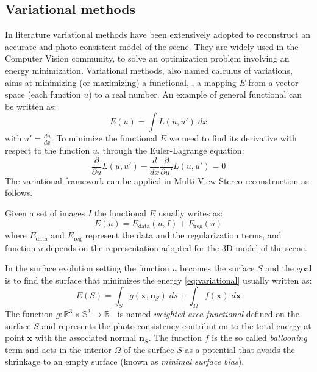 \subsection{Variational methods}
\label{subsec:variational}
In literature variational methods have been extensively adopted to reconstruct an accurate and photo-consistent model of the scene.
 They are widely used in the Computer Vision community, to solve an optimization problem involving an energy minimization.
Variational methods, also named  calculus of variations, aims at minimizing (or maximizing) a functional, \ie, a mapping $E$ from a vector space (each function $u$) to a real number. 
An example of general functional can be written as:
\begin{equation}
 E(u) = \int \mathit{L} (u, u')\;dx
\end{equation}
with $u'=\frac{du}{dx}$.
To minimize the functional $E$ we need to find its derivative with respect to the function $u$, through the Euler-Lagrange equation:
\begin{equation}
 \frac{\partial}{\partial u} \mathit{L} (u, u') - \frac{d}{dx} \frac{\partial}{\partial u'}\mathit{L} (u, u') =0
\end{equation}
The variational framework can be applied in Multi-View Stereo reconstruction \cite{hermosillo2002variational} as follows.

Given a set of images $\mathit{I}$ the functional $E$ usually writes as:
\begin{equation}
\label{eq:variational}
E(\mathit{u}) = E_{\text{data}}(\mathit{u}, \mathit{I}) + E_{\text{reg}} (\mathit{u})  
\end{equation}
where $E_{\text{data}}$  and $E_{\text{reg}}$ represent the data and the regularization terms, and function $\mathit{u}$ depends on the representation adopted for the 3D model of the scene.

In the surface evolution setting the function $\mathit{u}$ becomes the surface $\mathit{S}$ and the goal is to find the surface that minimizes the energy \eqref{eq:variational} usually written as:
\begin{equation}
 E(\mathit{S}) = \int_{\mathit{S}} g(\mathbf{x}, \mathbf{n}_{\mathit{S}}) \; ds  +\int_{\mathit{\Omega}} f(\mathbf{x}) \; d\mathbf{x}
\end{equation}
The function $\mathit{g}:\mathbb{R}^3\times\mathbb{S}^2 \rightarrow \mathbb{R}^+$ is named \emph{weighted area functional}  defined on the surface $\mathit{S}$ and represents the photo-consistency contribution to the total energy at point $\mathbf{x}$ with the associated normal $\mathbf{n}_{\mathit{S}}$.
The function $\mathit{f}$ is the so called \emph{ballooning} term and acts in the interior $\mathit{\Omega}$ of the surface $\mathit{S}$ as a potential that avoids the shrinkage to an empty surface (known as \emph{minimal surface bias}).


